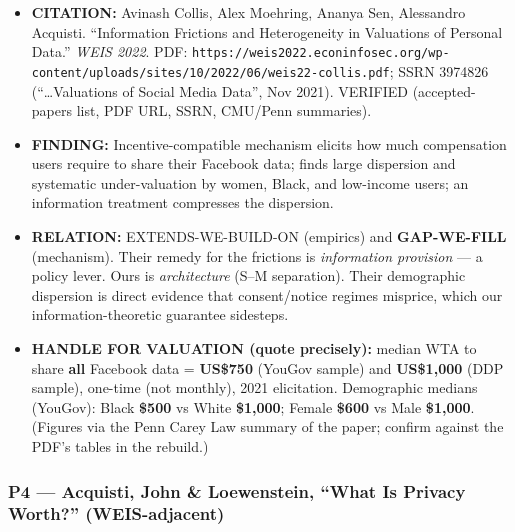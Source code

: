 \documentclass[
  11pt,
]{article}
\providecommand{\tightlist}{%
  \setlength{\itemsep}{0pt}\setlength{\parskip}{0pt}}
\begin{document}
\begin{itemize}
\tightlist
\item
  \textbf{CITATION:} Avinash Collis, Alex Moehring, Ananya Sen,
  Alessandro Acquisti. ``Information Frictions and Heterogeneity in
  Valuations of Personal Data.'' \emph{WEIS 2022}. PDF:
  \texttt{https://weis2022.econinfosec.org/wp-content/uploads/sites/10/2022/06/weis22-collis.pdf};
  SSRN 3974826 (``\ldots Valuations of Social Media Data'', Nov 2021).
  VERIFIED (accepted-papers list, PDF URL, SSRN, CMU/Penn summaries).
\item
  \textbf{FINDING:} Incentive-compatible mechanism elicits how much
  compensation users require to share their Facebook data; finds large
  dispersion and systematic under-valuation by women, Black, and
  low-income users; an information treatment compresses the dispersion.
\item
  \textbf{RELATION:} EXTENDS-WE-BUILD-ON (empirics) and
  \textbf{GAP-WE-FILL} (mechanism). Their remedy for the frictions is
  \emph{information provision} --- a policy lever. Ours is
  \emph{architecture} (S--M separation). Their demographic dispersion is
  direct evidence that consent/notice regimes misprice, which our
  information-theoretic guarantee sidesteps.
\item
  \textbf{HANDLE FOR VALUATION (quote precisely):} median WTA to share
  \textbf{all} Facebook data = \textbf{US\$750} (YouGov sample) and
  \textbf{US\$1,000} (DDP sample), one-time (not monthly), 2021
  elicitation. Demographic medians (YouGov): Black \textbf{\$500} vs
  White \textbf{\$1,000}; Female \textbf{\$600} vs Male
  \textbf{\$1,000}. (Figures via the Penn Carey Law summary of the
  paper; confirm against the PDF's tables in the rebuild.)
\end{itemize}

\subsubsection{P4 --- Acquisti, John \& Loewenstein, ``What Is Privacy
Worth?''
(WEIS-adjacent)}\label{p4-acquisti-john-loewenstein-what-is-privacy-worth-weis-adjacent}
\end{document}

